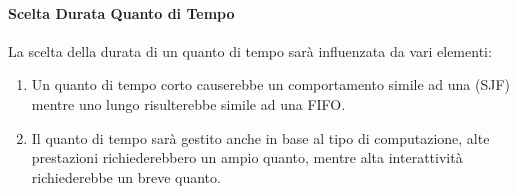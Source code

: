 \documentclass{article}
\begin{document}
\begin{enumerate}
\begin{enumerate}
    \paragraph{Scelta Durata Quanto di Tempo} La scelta della durata di un quanto di tempo sarà influenzata da vari elementi:
    \begin{enumerate}
        \item Un quanto di tempo corto causerebbe un comportamento simile ad una (SJF) mentre uno lungo risulterebbe simile ad una FIFO.
        \item Il quanto di tempo sarà gestito anche in base al tipo di computazione, alte prestazioni richiederebbero un ampio quanto, mentre alta interattività richiederebbe un breve quanto.
    \end{enumerate}
    \end{enumerate}
\end{enumerate}

\newpage
\end{document}
